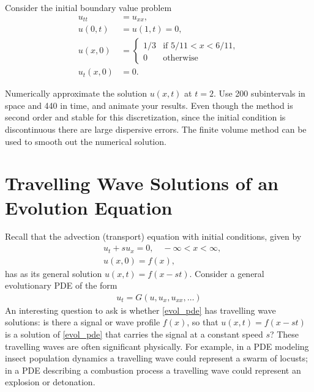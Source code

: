 \begin{problem}
Consider the initial boundary value problem
\begin{align*}
	u_{tt} &= u_{xx}, \\
	u(0,t) &= u(1,t) = 0, \\
	u(x,0) &= \begin{cases} 1/3 & \text{if } 5/11 < x < 6/11,\\
	0 & \text{otherwise}
	\end{cases}\\
	u_t(x,0) &= 0.
\end{align*}

Numerically approximate the solution $u(x,t)$ at $t = 2$.
Use 200 subintervals in space and 440 in time, and animate your results.
Even though the method is second order and stable for this discretization, since the initial condition is discontinuous there are large dispersive errors.
The finite volume method can be used to smooth out the numerical solution.
\end{problem}

\section*{Travelling Wave Solutions of an Evolution Equation}
Recall that the advection (transport) equation with initial conditions, given by
\begin{align*}
	&{ }u_t + su_x  = 0, \quad -\infty < x < \infty, \\
	&{ }u(x,0) = f(x),
\end{align*}
has as its general solution $u(x,t) = f(x -st)$.
Consider a general evolutionary PDE of the form
\begin{align}
u_t = G(u,u_x, u_{xx}, \ldots)
\label{evol_pde}
\end{align}
An interesting question to ask is whether \eqref{evol_pde} has travelling wave solutions: is there a signal or wave profile $f(x)$, so that $u(x,t) = f(x-st)$ is a solution of \eqref{evol_pde} that carries the signal at a constant speed $s$?
These travelling waves are often significant physically.
For example, in a PDE modeling insect population dynamics a travelling wave could represent a swarm of locusts; in a PDE describing a combustion process a travelling wave could represent an explosion or detonation.


